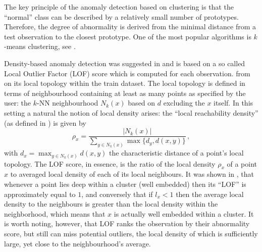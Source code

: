 \documentclass[a4paper,14pt]{extarticle}
\begin{document}
The key principle of the anomaly detection based on clustering is that the ``normal''
class can be described by a relatively small number of prototypes. Therefore, the
degree of abnormality is derived from the minimal distance from a test observation
to the closest prototype.  One of the most popular algorithms is $k$-means clustering,
see \cite{srivastava2005,srivastava2006}.

Density-based anomaly detection was suggested in \cite{breunig2000} and is based
on a so called Local Outlier Factor (LOF) score which is computed for each observation.
from on its local topology within the train dataset. The local topology is defined
in terms of neighbourhood containing at least as many points as specified by the
user: the $k$-NN neighbourhood $N_k(x)$ based on $d$ excluding the $x$ itself. In
this setting a natural the notion of local density arises: the ``local reachability
density'' (as defined in \cite{breunig2000}) is given by
\begin{equation*}
    \rho_x = \frac{|N_k(x)|}{\sum_{y\in N_k(x)} \max\{d_y, d(x,y)\}} \,,
\end{equation*}
with $d_x = \max_{y\in N_k(x)} d(x, y)$ the characteristic distance of a point's
local topology. The LOF score, in essence, is the ratio of the local density $\rho_x$
of a point $x$ to averaged local density of each of its local neighbours. It was
shown in \cite{breunig2000}, that whenever a point lies deep within a cluster (well
embedded) then its ``LOF'' is approximately equal to $1$, and conversely that if
$l_x < 1$ then the average local density to the neighbours is greater than the
local density within the neighborhood, which means that $x$ is actually well embedded
within a cluster. It is worth noting, however, that LOF ranks the observation by
their abnormality score, but still can miss potential outliers, the local density
of which is sufficiently large, yet close to the neighbourhood's average.
\end{document}
